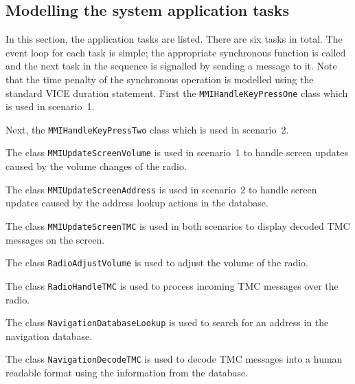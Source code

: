 

\subsection{Modelling the system application tasks}

In this section, the application tasks are listed. There are six tasks
in total. The event loop for each task is simple; the appropriate
synchronous function is called and the next task in the sequence is
signalled by sending a message to it. Note that the time penalty of the
synchronous operation is modelled using the standard VICE duration
statement. First the \verb+MMIHandleKeyPressOne+ class which is used in
scenario~1.



\noindent Next, the \verb+MMIHandleKeyPressTwo+ class which is used in
scenario~2.



\noindent The class \verb+MMIUpdateScreenVolume+ is used in scenario~1
to handle screen updates caused by the volume changes of the radio.



\noindent The class \verb+MMIUpdateScreenAddress+ is used in scenario~2
to handle screen updates caused by the address lookup actions in the database.



\noindent The class \verb+MMIUpdateScreenTMC+ is used in both scenarios
to display decoded TMC messages on the screen.



\noindent The class \verb+RadioAdjustVolume+ is used to adjust the volume
of the radio.



\noindent The class \verb+RadioHandleTMC+ is used to process incoming TMC
messages over the radio.



\noindent The class \verb+NavigationDatabaseLookup+ is used to search for
an address in the navigation database.



\noindent The class \verb+NavigationDecodeTMC+ is used to decode TMC messages
into a human readable format using the information from the database.

